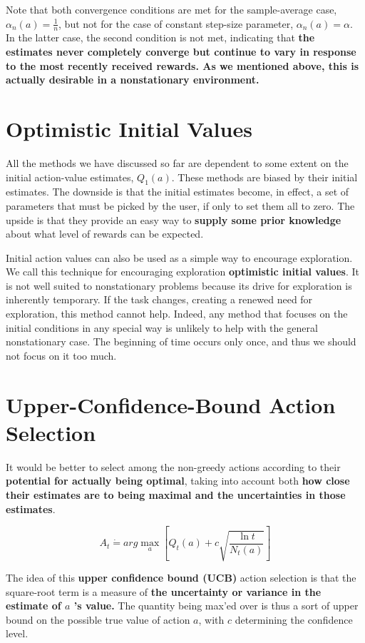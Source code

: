 Note that both convergence conditions are met for the sample-average case, $\alpha_n(a)=\frac{1}{n}$, but not for
the case of constant step-size parameter, $\alpha_n(a)=\alpha$. In the latter case, the second condition is not met, indicating that \textbf{the estimates never completely converge but continue to vary in response to the most recently received rewards. As we mentioned above, this is actually desirable in a nonstationary environment.}

\section{Optimistic Initial Values}
All the methods we have discussed so far are dependent to some extent on the initial action-value
estimates, $Q_1(a)$. These methods are biased by their initial estimates. The downside is that the initial estimates become, in effect, a set of parameters that must be picked by the user, if only to set them all to zero. The upside is that they provide an easy way to \textbf{supply some prior knowledge}
about what level of rewards can be expected.

Initial action values can also be used as a simple way to encourage exploration. We call this technique for encouraging exploration \textbf{optimistic initial values}. It is not well suited to nonstationary problems because its drive for exploration is inherently temporary. If the task changes, creating a renewed need for exploration, this method cannot help. Indeed, any method that focuses on the initial conditions in any special way is unlikely to help with the general nonstationary case. The beginning of time occurs only once, and thus we should not focus on it too much.

\section{Upper-Confidence-Bound Action Selection}
It would be better to select among the non-greedy actions according to their \textbf{potential for actually being optimal},
taking into account both \textbf{how close their estimates are to being maximal and the uncertainties in those
estimates}. 

\begin{equation}
    A_t \dot{=} arg \max_{a}[Q_t(a)+c\sqrt{\frac{\ln t}{N_t(a)}}]
\end{equation}

The idea of this \textbf{upper confidence bound (UCB)} action selection is that the square-root term is a
measure of \textbf{the uncertainty or variance in the estimate of $a$ ’s value.} The quantity being max’ed over is
thus a sort of upper bound on the possible true value of action $a$, with $c$ determining the confidence level.

